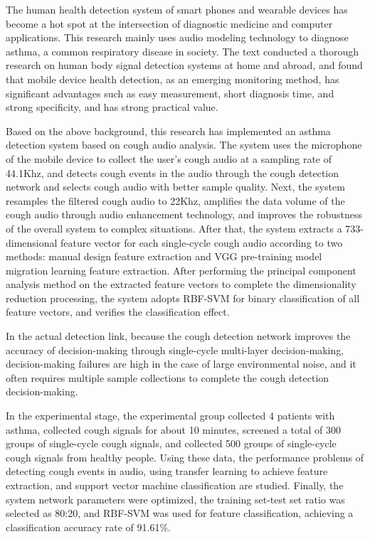 The human health detection system of smart phones and wearable devices has become a hot spot at the intersection of diagnostic medicine and computer applications. This research mainly uses audio modeling technology to diagnose asthma, a common respiratory disease in society. The text conducted a thorough research on human body signal detection systems at home and abroad, and found that mobile device health detection, as an emerging monitoring method, has significant advantages such as easy measurement, short diagnosis time, and strong specificity, and has strong practical value.

Based on the above background, this research has implemented an asthma detection system based on cough audio analysis. The system uses the microphone of the mobile device to collect the user's cough audio at a sampling rate of 44.1Khz, and detects cough events in the audio through the cough detection network and selects cough audio with better sample quality. Next, the system resamples the filtered cough audio to 22Khz, amplifies the data volume of the cough audio through audio enhancement technology, and improves the robustness of the overall system to complex situations. After that, the system extracts a 733-dimensional feature vector for each single-cycle cough audio according to two methods: manual design feature extraction and VGG pre-training model migration learning feature extraction. After performing the principal component analysis method on the extracted feature vectors to complete the dimensionality reduction processing, the system adopts RBF-SVM for binary classification of all feature vectors, and verifies the classification effect.

In the actual detection link, because the cough detection network improves the accuracy of decision-making through single-cycle multi-layer decision-making, decision-making failures are high in the case of large environmental noise, and it often requires multiple sample collections to complete the cough detection decision-making.

In the experimental stage, the experimental group collected 4 patients with asthma, collected cough signals for about 10 minutes, screened a total of 300 groups of single-cycle cough signals, and collected 500 groups of single-cycle cough signals from healthy people. Using these data, the performance problems of detecting cough events in audio, using transfer learning to achieve feature extraction, and support vector machine classification are studied. Finally, the system network parameters were optimized, the training set-test set ratio was selected as 80:20, and RBF-SVM was used for feature classification, achieving a classification accuracy rate of 91.61\%.